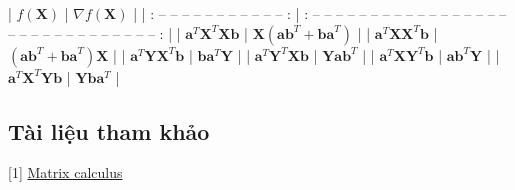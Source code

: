 | $f(\mathbf{X}) $                                   | $ \nabla f(\mathbf{X}) $                                   | 
| : --  --  --  --  --  --  --  --  --  --  -- :                               | : --  --  --  --  --  --  --  --  --  --  --  --  --  --  --  --  --  --  --  --  --  --  --  --  --  --  --  --  --  -- : | 
| $ \mathbf{a}^T \mathbf{X}^T \mathbf{Xb}$           | $ \mathbf{X}(\mathbf{ab}^T + \mathbf{ba}^T)        $       | 
| $ \mathbf{a}^T \mathbf{X} \mathbf{X}^T \mathbf{b}$ | $ (\mathbf{ab}^T + \mathbf{ba}^T)\mathbf{X}        $       | 
| $ \mathbf{a}^T \mathbf{Y} \mathbf{X}^T \mathbf{b}$ | $ \mathbf{b}\mathbf{a}^T \mathbf{Y}        $               | 
| $ \mathbf{a}^T \mathbf{Y}^T \mathbf{X} \mathbf{b}$ | $ \mathbf{Y}\mathbf{a}\mathbf{b}^T         $               | 
| $ \mathbf{a}^T \mathbf{X} \mathbf{Y}^T \mathbf{b}$ | $ \mathbf{a}\mathbf{b}^T\mathbf{Y}         $               | 
| $ \mathbf{a}^T \mathbf{X}^T \mathbf{Y} \mathbf{b}$ | $ \mathbf{Y}\mathbf{b}\mathbf{a}^T         $               | 
 
 
\subsection{Tài liệu tham khảo }
[1] \href{https://ccrma.stanford.edu/~dattorro/matrixcalc.pdf}{Matrix calculus} 
 
 
 
